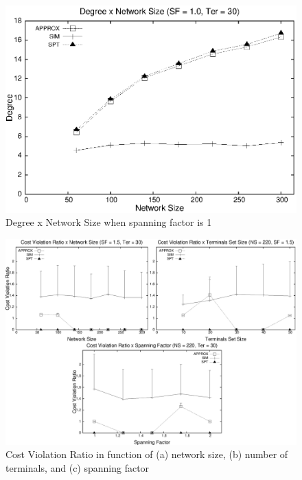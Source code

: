 \begin{figure}[!th]
\centering
\includegraphics[scale=0.63]{imagens/grau-220-sp1}
\caption{Degree x Network Size when spanning factor is 1}
\label{fig:degree_network-size}
\end{figure}
\begin{figure}[!th]
\centering
\includegraphics[scale=0.63]{imagens/violatedTerminalsCVR-220-3_graficos_nao_alinhados}
\caption{Cost Violation Ratio in function of (a) network size, (b) number of terminals, and (c) spanning factor}
\label{fig:cvr_abscissae}
\end{figure}
